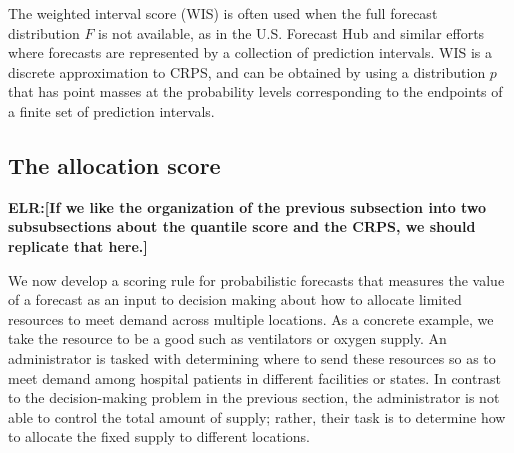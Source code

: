 \documentclass{article}
\def\elr#1{{\color{cyan}\textbf{ELR:[#1]}}}
\def\apg#1{{\color{red}\textbf{APG:[#1]}}}
\begin{document}
The weighted interval score (WIS) is often used when the full forecast distribution $F$ is not available, as in the U.S. Forecast Hub and similar efforts where forecasts are represented by a collection of prediction intervals. WIS is a discrete approximation to CRPS, and can be obtained by using a distribution $p$ that has point masses at the probability levels corresponding to the endpoints of a finite set of prediction intervals.


\subsection{The allocation score}
\label{sec:methods.allocation}

\elr{If we like the organization of the previous subsection into two subsubsections about the quantile score and the CRPS, we should replicate that here.}

We now develop a scoring rule for probabilistic forecasts that measures the value of a forecast as an input to decision making about how to allocate limited resources to meet demand across multiple locations. As a concrete example, we take the resource to be a good such as ventilators or oxygen supply. An administrator is tasked with determining where to send these resources so as to meet demand among hospital patients in different facilities or states. In contrast to the decision-making problem in the previous section, the administrator is not able to control the total amount of supply; rather, their task is to determine how to allocate the fixed supply to different locations.
\end{document}
